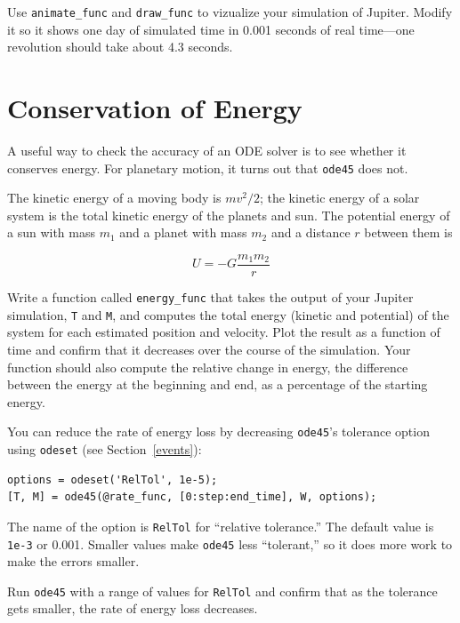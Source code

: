 \documentclass{book}
\begin{document}
\begin{ex}
Use {\tt animate\_func} and {\tt draw\_func} to vizualize your
simulation of Jupiter. Modify it so it shows one day of simulated
time in 0.001 seconds of real time---one revolution should take
about 4.3 seconds.
\end{ex}


\section{Conservation of Energy}

A useful way to check the accuracy of an ODE solver is to
see whether it conserves energy. For planetary
motion, it turns out that {\tt ode45} does not.

The kinetic energy of a moving body is $m v^2 / 2$; the
kinetic energy of a solar system is the total kinetic
energy of the planets and sun.
The potential energy of a sun with mass $m_1$ and a
planet with mass $m_2$ and a distance $r$ between them is

\[ U = -G \frac{m_1 m_2}{r} \]
%

\begin{ex}
Write a function called {\tt energy\_func} that takes the output of
your Jupiter simulation, {\tt T} and {\tt M}, and computes the total
energy (kinetic and potential) of the system for each estimated
position and velocity. Plot the result as a function of time and
confirm that it decreases over the course of the simulation. Your
function should also compute the relative change in energy, the
difference between the energy at the beginning and end, as a
percentage of the starting energy.
\end{ex}

You can reduce the rate of energy loss by decreasing {\tt ode45}'s
tolerance option using {\tt odeset} (see Section~\ref{events}):

\begin{verbatim}
options = odeset('RelTol', 1e-5);
[T, M] = ode45(@rate_func, [0:step:end_time], W, options);
\end{verbatim}
%
The name of the option is {\tt RelTol} for ``relative tolerance.''
The default value is {\tt 1e-3} or 0.001. Smaller values
make {\tt ode45} less ``tolerant,'' so it does more work to
make the errors smaller. 

\begin{ex}
Run {\tt ode45} with a range of values for {\tt RelTol} and confirm
that as the tolerance gets smaller, the rate of energy loss
decreases.
\end{ex}
\end{document}
